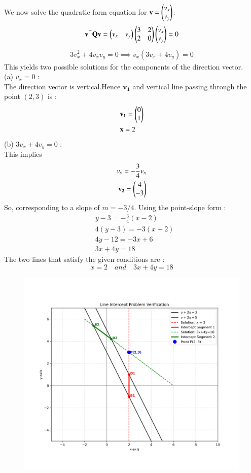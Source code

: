 \documentclass[journal]{IEEEtran}
\begin{document}
We now solve the quadratic form equation for $\mathbf{v} = \begin{pmatrix}v_x \\ v_y\end{pmatrix}$:
\begin{align} \mathbf{v}^\top \mathbf{Q} \mathbf{v} = \begin{pmatrix}v_x & v_y\end{pmatrix} \begin{pmatrix}3 & 2 \\ 2 & 0\end{pmatrix} \begin{pmatrix}v_x \\ v_y\end{pmatrix} = 0 \end{align}
\begin{align} 
3v_x^2 + 4v_xv_y = 0 \implies v_x(3v_x + 4v_y) = 0 
\end{align}
This yields two possible solutions for the components of the direction vector.\\
(a) $v_x = 0$ : \\The direction vector is vertical.Hence $\mathbf{v_1}$ and vertical line passing through the point $(2, 3)$ is :
\begin{align} 
	&\mathbf{v_1} = \begin{pmatrix}0 \\ 1\end{pmatrix}\\
	&\mathbf{x} = 2 
\end{align}
(b) $3v_x + 4v_y = 0$ :\\ This implies \begin{align}
v_y = -\frac{3}{4}v_x\\
\mathbf{v_2} = \begin{pmatrix}4 \\ -3\end{pmatrix}
\end{align}
So, corresponding to a slope of $m = -3/4$. Using the point-slope form :
\begin{align}
&y - 3 = -\frac{3}{4}(x - 2) \\
	&4(y - 3) = -3(x - 2) \\
	&4y - 12 = -3x + 6 \\
     &3x + 4y = 18
\end{align}
The two lines that satisfy the given conditions are :
\[	x = 2 \quad and\quad
3x + 4y = 18 \]

\begin{figure}[H]
	\centering
	\includegraphics[width=1.1\linewidth]{figs/line_intercept_plot}
\end{figure}
\end{document}
